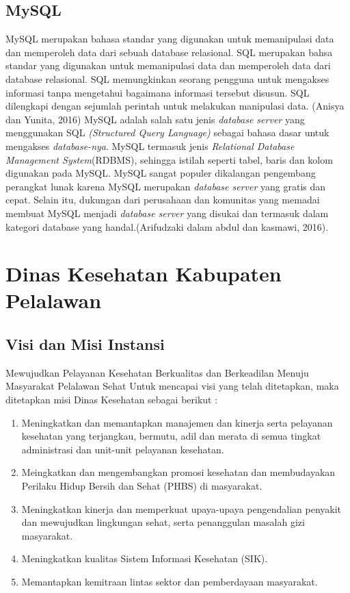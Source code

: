 \subsection{MySQL}
MySQL merupakan bahasa standar yang digunakan untuk memanipulasi data dan memperoleh data dari sebuah database relasional. SQL merupakan bahsa standar yang digunakan untuk memanipulasi data dan memperoleh data dari database relasional. SQL memungkinkan seorang pengguna untuk mengakses informasi tanpa mengetahui bagaimana informasi tersebut disusun. SQL dilengkapi dengan sejumlah perintah untuk melakukan manipulasi data. (Anisya dan Yunita, 2016)
MySQL adalah salah satu jenis \textit{database server} yang menggunakan SQL \textit{(Structured Query Language)} sebagai bahasa dasar untuk mengakses \textit{database-nya}. MySQL termasuk jenis \textit{Relational Database Management System}(RDBMS), sehingga istilah seperti tabel, baris dan kolom digunakan pada MySQL. MySQL sangat populer dikalangan pengembang perangkat lunak karena MySQL merupakan \textit{database server} yang gratis dan cepat. Selain itu, dukungan dari perusahaan dan komunitas yang memadai membuat MySQL menjadi \textit{database server} yang disukai dan termasuk dalam kategori database yang handal.(Arifudzaki dalam abdul dan kasmawi, 2016).

\section{Dinas Kesehatan Kabupaten Pelalawan}
\subsection{Visi dan Misi Instansi}

Mewujudkan Pelayanan Kesehatan Berkualitas dan Berkeadilan Menuju Masyarakat Pelalawan Sehat Untuk mencapai visi yang telah ditetapkan, maka ditetapkan misi Dinas Kesehatan sebagai berikut :
\begin{enumerate}
	
	\item Meningkatkan dan memantapkan manajemen dan kinerja serta pelayanan kesehatan yang terjangkau, bermutu, adil dan merata di semua tingkat administrasi dan unit-unit pelayanan kesehatan.
	
	\item Meingkatkan dan mengembangkan promosi kesehatan dan membudayakan Perilaku Hidup Bersih dan Sehat (PHBS) di masyarakat.
	
	\item Meningkatkan kinerja dan memperkuat 
	upaya-upaya pengendalian penyakit dan mewujudkan lingkungan
	sehat, serta penanggulan masalah gizi masyarakat.
	
	\item Meningkatkan kualitas Sistem Informasi Kesehatan (SIK).
	
	\item Memantapkan kemitraan lintas sektor dan pemberdayaan masyarakat.
\end{enumerate}

